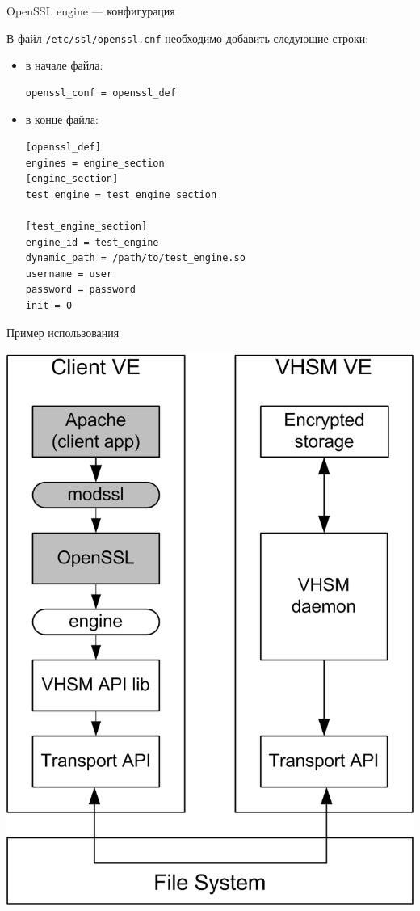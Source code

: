 \documentclass[utf8, 11pt]{beamer}
\begin{document}
\begin{frame}[fragile]{OpenSSL engine --- конфигурация}

\lstset{language=C++, basicstyle=\ttfamily\scriptsize}

В файл \texttt{/etc/ssl/openssl.cnf} необходимо добавить следующие строки:
\begin{itemize}
\item в начале файла:
\begin{lstlisting}
openssl_conf = openssl_def
\end{lstlisting}
\item в конце файла:
\begin{lstlisting}
[openssl_def]
engines = engine_section
[engine_section]
test_engine = test_engine_section

[test_engine_section]
engine_id = test_engine
dynamic_path = /path/to/test_engine.so
username = user
password = password
init = 0
\end{lstlisting}

\end{itemize}

\end{frame}

\begin{frame}{Пример использования}
\begin{center}
\includegraphics[scale=0.7]{img3-1}
\end{center}
\end{frame}
\end{document}
